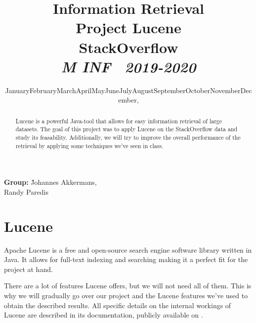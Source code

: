 \documentclass[11pt]{article}
\renewcommand{\today}{\ifcase \month \or January\or February\or March\or April\or May\or June\or July\or August\or September\or October\or November\or December\fi, \number \year}
\newcommand{\topic}{Project Lucene}
\newcommand{\paper}{StackOverflow\\
	\small{\textit{M INF \  2019-2020}}
}
\newcommand{\team}{
	\=Johannes Akkermans, \\\>Randy Paredis
}
\begin{document}
\title{\textmd{\textbf{Information Retrieval}}\\\normalsize\vspace{0.1in}\Large{\topic}\\\large{\paper}\Large\\\vspace{0.1in}}
\author{}
\date{\today}
\maketitle
\begin{center}
	\parbox{0cm}{
		\begin{tabbing}
		\textbf{Group:} \team
		\end{tabbing}
	}
\end{center}

\vspace*{1em}

\begin{abstract}
    Lucene is a powerful Java-tool that allows for easy information retrieval of large datasets. The goal of this project was to apply Lucene on the StackOverflow data and study its feasability. Additionally, we will try to improve the overall performance of the retrieval by applying some techniques we've seen in class.
\end{abstract}

\newpage


\section{Lucene}\label{sec:lucene}
Apache Lucene is a free and open-source search engine software library written in Java. It allows for full-text indexing and searching making it a perfect fit for the project at hand. \cite{lucene-wiki}

There are a lot of features Lucene offers, but we will not need all of them. This is why we will gradually go over our project and the Lucene features we've used to obtain the described results. All specific details on the internal workings of Lucene are described in its documentation, publicly available on \cite{lucene}.
\end{document}
